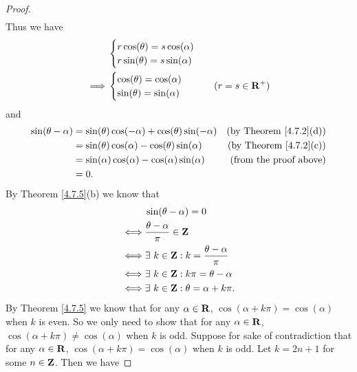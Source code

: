 \begin{proof}
\begin{align*}
    \end{align*}
    Thus we have
    \begin{align*}
                 & \begin{cases}
                       r \cos(\theta) = s \cos(\alpha) \\
                       r \sin(\theta) = s \sin(\alpha)
                   \end{cases}    \\
        \implies & \begin{cases}
                       \cos(\theta) = \cos(\alpha) \\
                       \sin(\theta) = \sin(\alpha)
                   \end{cases}     & (r = s \in \mathbf{R}^+)
    \end{align*}
    and
    \begin{align*}
        \sin(\theta - \alpha) & = \sin(\theta) \cos(-\alpha) + \cos(\theta) \sin(-\alpha) & \text{(by Theorem \ref{4.7.2}(d))} \\
                              & = \sin(\theta) \cos(\alpha) - \cos(\theta) \sin(\alpha)   & \text{(by Theorem \ref{4.7.2}(c))} \\
                              & = \sin(\alpha) \cos(\alpha) - \cos(\alpha) \sin(\alpha)   & \text{(from the proof above)}      \\
                              & = 0.
    \end{align*}
    By Theorem \ref{4.7.5}(b) we know that
    \begin{align*}
             & \sin(\theta - \alpha) = 0                           \\
        \iff & \frac{\theta - \alpha}{\pi} \in \mathbf{Z}                  \\
        \iff & \exists\ k \in \mathbf{Z} : k = \frac{\theta - \alpha}{\pi} \\
        \iff & \exists\ k \in \mathbf{Z} : k \pi = \theta - \alpha         \\
        \iff & \exists\ k \in \mathbf{Z} : \theta = \alpha + k \pi.
    \end{align*}
    By Theorem \ref{4.7.5} we know that for any \(\alpha \in \mathbf{R}\), \(\cos(\alpha + k \pi) = \cos(\alpha)\) when \(k\) is even.
    So we only need to show that for any \(\alpha \in \mathbf{R}\), \(\cos(\alpha + k \pi) \neq \cos(\alpha)\) when \(k\) is odd.
    Suppose for sake of contradiction that for any \(\alpha \in \mathbf{R}\), \(\cos(\alpha + k \pi) = \cos(\alpha)\) when \(k\) is odd.
    Let \(k = 2n + 1\) for some \(n \in \mathbf{Z}\).
    Then we have

\end{proof}
